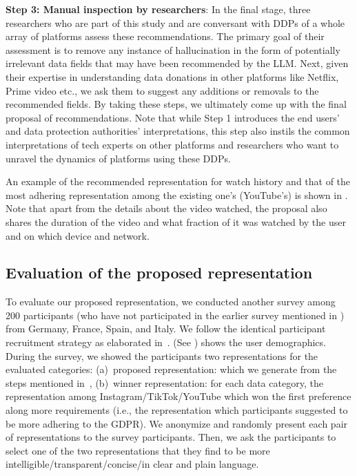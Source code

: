 \noindent
\textbf{Step 3: Manual inspection by researchers}: In the final stage, three researchers who are part of this study and are conversant with DDPs of a whole array of platforms assess these recommendations.
The primary goal of their assessment is to remove any instance of hallucination in the form of potentially irrelevant data fields that may have been recommended by the LLM. 
Next, given their expertise in understanding data donations in other platforms like Netflix, Prime video etc., we ask them to suggest any additions or removals to the recommended fields.
By taking these steps, we ultimately come up with the final proposal of recommendations.
Note that while Step 1 introduces the end users' and data protection authorities' interpretations, this step also instils the common interpretations of tech experts on other platforms and researchers who want to unravel the dynamics of platforms using these DDPs.

An example of the recommended representation for watch history and that of the most adhering representation among the existing one's (YouTube's) is shown in .
Note that apart from the details about the video watched, the proposal also shares the duration of the video and what fraction of it was watched by the user and on which device and network.


\subsection{Evaluation of the proposed representation}\label{Sec: EvalProposal}
To evaluate our proposed representation, we conducted another survey among 200 participants (who have not participated in the earlier survey mentioned in ) from Germany, France, Spain, and Italy. We follow the identical participant recruitment strategy as elaborated in~.  (See ) shows the user demographics.
During the survey, we showed the participants two representations for the evaluated categories: (a)~proposed representation: which we generate from the steps mentioned in~, (b)~winner representation: for each data category, the representation among Instagram/TikTok/YouTube which won the first preference along more requirements (i.e., the representation which participants suggested to be more adhering to the GDPR).
We anonymize and randomly present each pair of representations to the survey participants.
Then, we ask the participants to select one of the two representations that they find to be more intelligible/transparent/concise/in clear and plain language.

